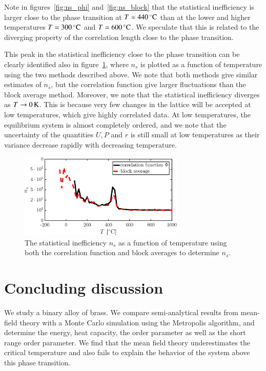 Note in figures~\ref{fig:ns_phi} and~\ref{fig:ns_block} that the statistical inefficiency is larger close to the phase transition at $T \approx \unit[440]{^\circ C}$ than at the lower and higher temperatures  $T = \unit[300]{^\circ C}$ and $T = \unit[600]{^\circ C}$. We speculate that this is related to the diverging property of the correlation length close to the phase transition. 

This peak in the statistical inefficiency close to the phase transition can be clearly identified also in figure~\ref{fig:ns_both}, where $n_s$ is plotted as a function of temperature using the two methods described above. We note that both methods give similar estimates of $n_s$, but the correlation function give larger fluctuations than the block average method. Moreover, we note that the statistical inefficiency diverges as $T \rightarrow \unit[0]{K}$. This is because very few changes in the lattice will be accepted at low temperatures, which give highly correlated data. At low temperatures, the equilibrium system is almost completely ordered, and we note that the uncertainty of the quantities $U, P$ and $r$ is still small at low temperatures as their variance decrease rapidly with decreasing temperature. 

\begin{figure}[!ht]
\begin{center}
  \includegraphics[width=0.7\textwidth]{../figures/stat_inefficiency_both} 
  \caption{The statistical inefficiency $n_s$ as a function of temperature using both the correlation function and block averages to determine $n_s$.}
  \label{fig:ns_both}
\end{center}
\end{figure}
\section*{Concluding discussion}
We study a binary alloy of brass. We compare semi-analytical results from mean-field theory with a Monte Carlo simulation using the Metropolis algorithm, and determine the energy, heat capacity, the order parameter as well as the short range order parameter. 
We find that the mean field theory underestimates the critical temperature and also fails to explain the behavior of the system above this phase transition. 
\newpage

